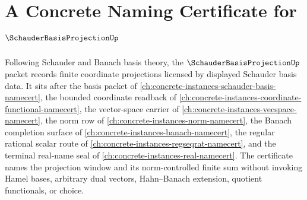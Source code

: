 \chapter{A Concrete Naming Certificate for $\SchauderBasisProjectionUp$}
\label{ch:concrete-instances-schauder-basis-projection-namecert}

Following Schauder and Banach basis theory, the $\SchauderBasisProjectionUp$ packet records finite coordinate projections licensed by displayed Schauder basis data. It sits after the basis packet of \autoref{ch:concrete-instances-schauder-basis-namecert}, the bounded coordinate readback of \autoref{ch:concrete-instances-coordinate-functional-namecert}, the vector-space carrier of \autoref{ch:concrete-instances-vecspace-namecert}, the norm row of \autoref{ch:concrete-instances-norm-namecert}, the Banach completion surface of \autoref{ch:concrete-instances-banach-namecert}, the regular rational scalar route of \autoref{ch:concrete-instances-regseqrat-namecert}, and the terminal real-name seal of \autoref{ch:concrete-instances-real-namecert}. The certificate names the projection window and its norm-controlled finite sum without invoking Hamel bases, arbitrary dual vectors, Hahn--Banach extension, quotient functionals, or choice.

